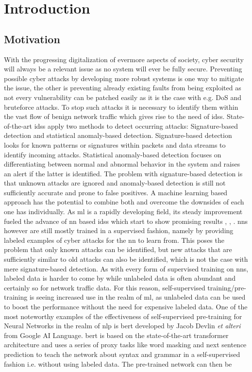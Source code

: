 \chapter{Introduction}

\section{Motivation} \label{sect.motivation}

With the progressing digitalization of evermore aspects of society, cyber security will always be a relevant issue as no system will ever be fully secure. Preventing possible cyber attacks by developing more robust systems is one way to mitigate the issue, the other is preventing already existing faults from being exploited as not every vulnerability can be patched easily as it is the case with e.g. DoS and bruteforce attacks. To stop such attacks it is necessary to identify them within the vast flow of benign network traffic which gives rise to the need of \glspl{ids}. State-of-the-art \glspl{ids} apply two methods to detect occurring attacks: Signature-based detection and statistical anomaly-based detection. Signature-based detection looks for known patterns or signatures within packets and data streams to identify incoming attacks. Statistical anomaly-based detection focuses on differentiating between normal and abnormal behavior in the system and raises an alert if the latter is identified. The problem with signature-based detection is that unknown attacks are ignored and anomaly-based detection is still not sufficiently accurate and prone to false positives. A machine learning based approach has the potential to combine both and overcome the downsides of each one has individually. As \gls{ml} is a rapidly developing field, its steady improvement fueled the advance of \gls{nn} based \glspl{ids} which start to show promising results \cite{fog_based_detection_survey_2020}, \cite{kitsune}, \cite{ml_ids_survey}. \glspl{nn} however are still mostly trained in a supervised fashion, namely by providing labeled examples of cyber attacks for the \gls{nn} to learn from. This poses the problem that only known attacks can be identified, but new attacks that are sufficiently similar to old attacks can also be identified, which is not the case with mere signature-based detection. As with every form of supervised training on \glspl{nn}, labeled data is harder to come by while unlabeled data is often abundant and certainly so for network traffic data. For this reason, self-supervised training/pre-training is seeing increased use in the realm of \gls{ml}, as unlabeled data can be used to boost the performance without the need for expensive labeled data. One of the most noteworthy examples of the effectiveness of self-supervised pre-training for Neural Networks in the realm of \gls{nlp} is \gls{bert} \cite{bert} developed by Jacob Devlin \textit{et alteri} from Google AI Language. \gls{bert} is based on the state-of-the-art transformer architecture \cite{attention} and uses a series of proxy tasks like word masking and next sentence prediction to teach the network about syntax and grammar in a self-supervised fashion i.e. without using labeled data. The pre-trained network can then be 